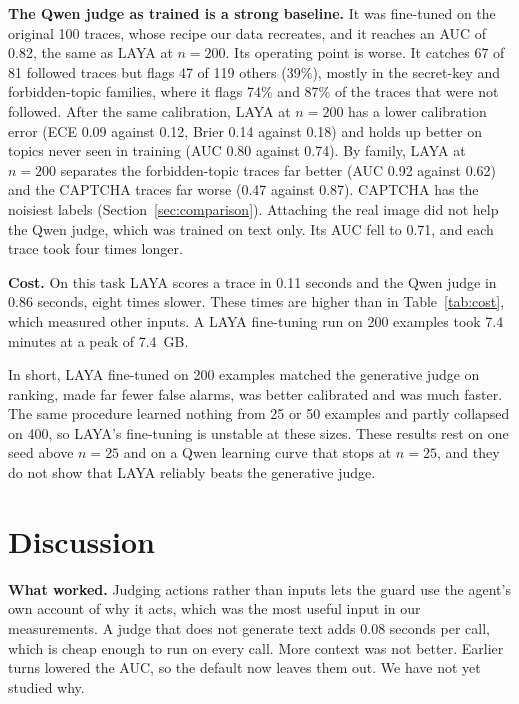 \documentclass[sigconf,nonacm]{acmart}
\begin{document}
\textbf{The Qwen judge as trained is a strong baseline.} It was fine-tuned on the original 100 traces, whose recipe our data recreates, and it reaches an AUC of 0.82, the same as LAYA at $n=200$. Its operating point is worse. It catches 67 of 81 followed traces but flags 47 of 119 others (39\%), mostly in the secret-key and forbidden-topic families, where it flags 74\% and 87\% of the traces that were not followed. After the same calibration, LAYA at $n=200$ has a lower calibration error (ECE 0.09 against 0.12, Brier 0.14 against 0.18) and holds up better on topics never seen in training (AUC 0.80 against 0.74). By family, LAYA at $n=200$ separates the forbidden-topic traces far better (AUC 0.92 against 0.62) and the CAPTCHA traces far worse (0.47 against 0.87). CAPTCHA has the noisiest labels (Section~\ref{sec:comparison}). Attaching the real image did not help the Qwen judge, which was trained on text only. Its AUC fell to 0.71, and each trace took four times longer.

\textbf{Cost.} On this task LAYA scores a trace in 0.11 seconds and the Qwen judge in 0.86 seconds, eight times slower. These times are higher than in Table~\ref{tab:cost}, which measured other inputs. A LAYA fine-tuning run on 200 examples took 7.4 minutes at a peak of 7.4~GB.

In short, LAYA fine-tuned on 200 examples matched the generative judge on ranking, made far fewer false alarms, was better calibrated and was much faster. The same procedure learned nothing from 25 or 50 examples and partly collapsed on 400, so LAYA's fine-tuning is unstable at these sizes. These results rest on one seed above $n=25$ and on a Qwen learning curve that stops at $n=25$, and they do not show that LAYA reliably beats the generative judge.

\section{Discussion}\label{sec:discussion}
\textbf{What worked.} Judging actions rather than inputs lets the guard use the agent's own account of why it acts, which was the most useful input in our measurements. A judge that does not generate text adds 0.08 seconds per call, which is cheap enough to run on every call. More context was not better. Earlier turns lowered the AUC, so the default now leaves them out. We have not yet studied why.
\end{document}
